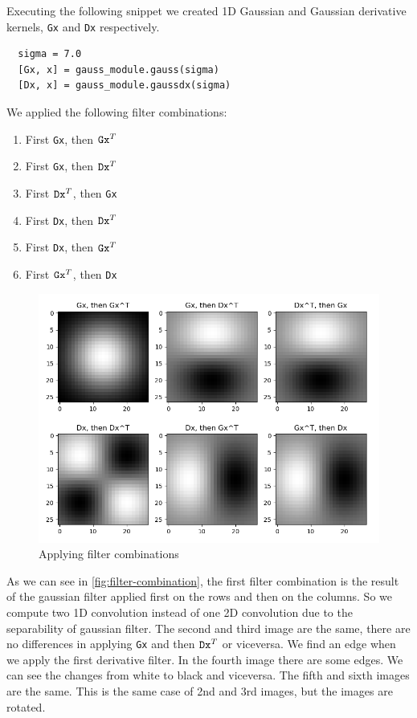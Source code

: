 \documentclass{article}
\begin{document}
\noindent
Executing the following snippet we created 1D Gaussian and Gaussian derivative kernels, \verb|Gx| and \verb|Dx| respectively.
\begin{verbatim}
  sigma = 7.0
  [Gx, x] = gauss_module.gauss(sigma)
  [Dx, x] = gauss_module.gaussdx(sigma)
\end{verbatim}
We applied the following filter combinations:
\begin{enumerate}
    \item First \verb|Gx|, then $ \verb|Gx|^T $
    \item First \verb|Gx|, then $ \verb|Dx|^T $
    \item First $ \verb|Dx|^T $, then \verb|Gx|
    \item First \verb|Dx|, then $ \verb|Dx|^T $
    \item First \verb|Dx|, then $ \verb|Gx|^T $
    \item First $ \verb|Gx|^T $, then \verb|Dx|
\end{enumerate}

\begin{figure}[ht]
    \centering
    \includegraphics[width=\textwidth]{images/Q1.d-F2.png}
    \caption{Applying filter combinations}
    \label{fig:filter-combination}
\end{figure}

\noindent
\newline
As we can see in \autoref{fig:filter-combination}, the first filter combination is the result of the gaussian filter applied first on the rows and then on the columns. So we compute two 1D convolution instead of one 2D convolution due to the separability of gaussian filter.
\newline
The second and third image are the same, there are no differences in applying \verb|Gx| and then $\verb|Dx|^T$ or viceversa. We find an edge when we apply the first derivative filter.
\newline
In the fourth image there are some edges. We can see the changes from white to black and viceversa.
\newline
The fifth and sixth images are the same. This is the same case of 2nd and 3rd images, but the images are rotated. 
\end{document}
